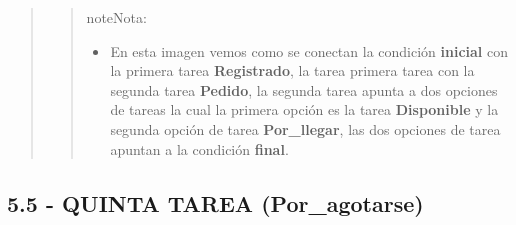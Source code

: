 \documentclass[letterpaper,11pt,spanish]{sphinxmanual}
\begin{document}
\begin{quote}
\begin{quote}
\begin{notice}{note}{Nota:}
\begin{itemize}
\item {} 
En esta imagen vemos como se conectan la condición  \textbf{inicial} con la primera tarea \textbf{Registrado}, la tarea primera tarea con la segunda tarea \textbf{Pedido}, la segunda tarea apunta a dos opciones de tareas la cual la primera opción es la tarea \textbf{Disponible} y la segunda opción de tarea \textbf{Por\_llegar}, las dos opciones de tarea apuntan a la condición \textbf{final}.

\end{itemize}
\end{notice}
\end{quote}
\end{quote}


\subsection{\textbf{5.5 - QUINTA TAREA (Por\_agotarse)}}
\end{document}
